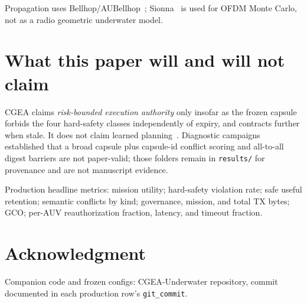 \documentclass[journal]{IEEEtran}
\begin{document}
Propagation uses Bellhop/AUBellhop~\cite{porter2011}; Sionna~\cite{hoydis2022sionna} is used for OFDM Monte Carlo, not as a radio geometric underwater model.

\section{What this paper will and will not claim}

CGEA claims \emph{risk-bounded execution authority} only insofar as the frozen capsule forbids the four hard-safety classes independently of expiry, and contracts further when stale. It does not claim learned planning~\cite{chen2023agents}. Diagnostic campaigns established that a broad capsule plus capsule-id conflict scoring and all-to-all digest barriers are not paper-valid; those folders remain in \texttt{results/} for provenance and are not manuscript evidence.

Production headline metrics: mission utility; hard-safety violation rate; safe useful retention; semantic conflicts by kind; governance, mission, and total TX bytes; GCO; per-AUV reauthorization fraction, latency, and timeout fraction.

\section*{Acknowledgment}

Companion code and frozen configs: CGEA-Underwater repository, commit documented in each production row's \texttt{git\_commit}.



\end{document}

